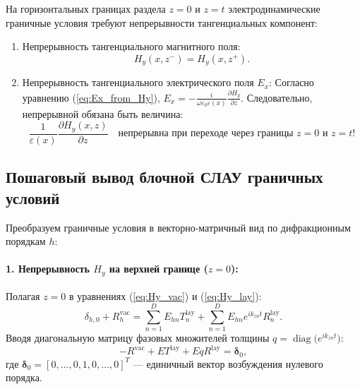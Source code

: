 \documentclass[a4paper,11pt]{article}
\begin{document}
На горизонтальных границах раздела $z = 0$ и $z = t$ электродинамические граничные условия требуют непрерывности тангенциальных компонент:
\begin{enumerate}
    \item Непрерывность тангенциального магнитного поля:
    \begin{equation}
        H_y(x, z^-) = H_y(x, z^+).
    \end{equation}
    \item Непрерывность тангенциального электрического поля $E_x$:
    Согласно уравнению (\ref{eq:Ex_from_Hy}), $E_x = -\frac{i}{\omega\varepsilon_0\varepsilon(x)} \frac{\partial H_y}{\partial z}$. Следовательно, непрерывной обязана быть величина:
    \begin{equation}
        \frac{1}{\varepsilon(x)} \frac{\partial H_y(x, z)}{\partial z} \quad \text{непрерывна при переходе через границы $z = 0$ и $z = t$!}
    \end{equation}
\end{enumerate}

\subsection{Пошаговый вывод блочной СЛАУ граничных условий}

Преобразуем граничные условия в векторно-матричный вид по дифракционным порядкам $h$:

\paragraph{1. Непрерывность $H_y$ на верхней границе ($z = 0$):}
Полагая $z = 0$ в уравнениях (\ref{eq:Hy_vac}) и (\ref{eq:Hy_lay}):
\begin{equation}
    \delta_{h, 0} + R_h^{\text{vac}} = \sum_{n=1}^D E_{hn} T_n^{\text{lay}} + \sum_{n=1}^D E_{hn} e^{i k_{zn} t} R_n^{\text{lay}}.
\end{equation}
Вводя диагональную матрицу фазовых множителей толщины $q = \operatorname{diag}\big(e^{i k_{zn} t}\big)$:
\begin{equation}
    - R^{\text{vac}} + E T^{\text{lay}} + E q R^{\text{lay}} = \boldsymbol{\delta}_0,
    \label{eq:bc1_p}
\end{equation}
где $\boldsymbol{\delta}_0 = [0, \dots, 0, 1, 0, \dots, 0]^T$ — единичный вектор возбуждения нулевого порядка.
\end{document}
